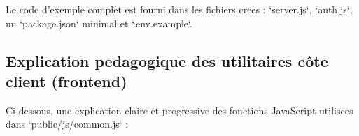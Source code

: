 \documentclass[a4paper,12pt]{book}
\begin{document}
Le code d'exemple complet est fourni dans les fichiers crees : `server.js`,
`auth.js`, un `package.json` minimal et `.env.example`.



\subsection{Explication pedagogique des utilitaires côte client (frontend)}
Ci-dessous, une explication claire et progressive des fonctions JavaScript
utilisees dans `public/js/common.js` :
\end{document}
